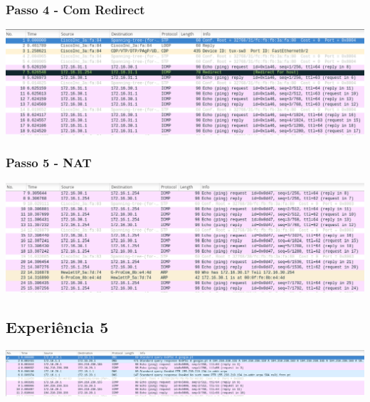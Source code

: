 \documentclass[a4paper]{article}
\begin{document}
\subsubsection{Passo 4 - Com Redirect}

\includegraphics[scale=0.35]{Exp4-4-withRedirect.png}

\subsubsection{Passo 5 - NAT}

\includegraphics[scale=0.35]{Exp4-5-NAT.png}

\subsection{Experiência 5}

\includegraphics[scale=0.30]{Exp5-DNS.png}

\newpage
\end{document}
